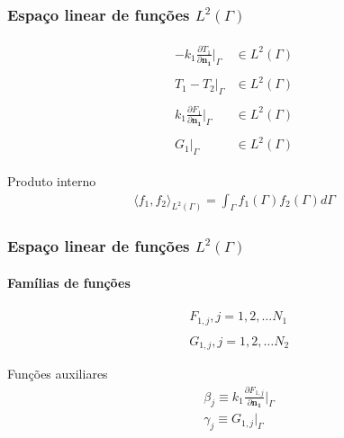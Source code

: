 \documentclass{beamer}
\begin{document}
\begin{frame}
	\frametitle{Espaço linear de funções $L^2(\Gamma)$}
	
	\begin{align*}
		\begin{array}{ll}
			-k_1 \displaystyle \frac{\partial T_1}{\partial\mathbf{n_1}}\bigg|_\Gamma & \in L^2(\Gamma) \\ \\		
			T_1 - T_2|_\Gamma & \in L^2(\Gamma)\\ \\
			k_1 \displaystyle\frac{\partial F_1}{\partial\mathbf{n_1}}\bigg|_\Gamma & \in L^2(\Gamma) \\ \\
			G_1|_\Gamma & \in L^2(\Gamma)			
		\end{array}
	\end{align*}
	\pause
	
	\begin{alertblock}{Produto interno}
		\begin{align*}
		\langle f_1, f_2\rangle_{L^2(\Gamma)} = \int_\Gamma f_1(\Gamma) f_2(\Gamma) d\Gamma			
		\end{align*} 
	\end{alertblock}
\end{frame}

\begin{frame}
	\frametitle{Espaço linear de funções $L^2(\Gamma)$}
	\framesubtitle{Famílias de funções}
	\begin{align*}
		& F_{1,j}, j=1,2,\ldots N_1 \\ \\
		& G_{1,j}, j=1,2,\ldots N_2
	\end{align*}
	
	\begin{alertblock}{Funções auxiliares}
		\begin{align*}
		& \beta_j \equiv k_1 \frac{\partial F_{1,j}}{\partial\mathbf{n_1}}\bigg|_\Gamma \\
		& \gamma_j \equiv G_{1,j}\big|_\Gamma
		\end{align*}
	\end{alertblock}
	
\end{frame}
\end{document}
